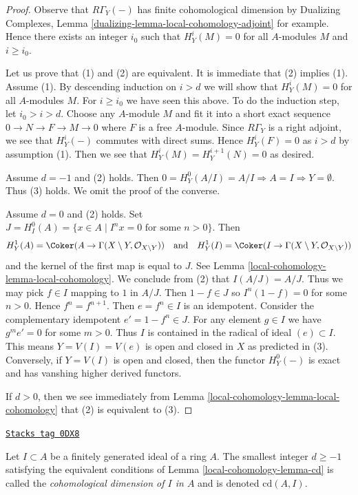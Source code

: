 \begin{proof}
Observe that $R\Gamma_Y(-)$ has finite cohomological dimension by
Dualizing Complexes, Lemma \ref{dualizing-lemma-local-cohomology-adjoint}
for example. Hence there exists an integer $i_0$ such that
$H^i_Y(M) = 0$ for all $A$-modules $M$ and $i \geq i_0$.

\medskip\noindent
Let us prove that (1) and (2) are equivalent. It is immediate that
(2) implies (1). Assume (1). By descending induction on $i > d$
we will show that $H^i_Y(M) = 0$ for all $A$-modules $M$.
For $i \geq i_0$ we have seen this above. To do the induction step,
let $i_0 > i > d$. Choose any $A$-module $M$ and fit it into
a short exact sequence $0 \to N \to F \to M \to 0$ where $F$ is a
free $A$-module. Since $R\Gamma_Y$ is a right adjoint, we see that
$H^i_Y(-)$ commutes with direct sums. Hence $H^i_Y(F) = 0$
as $i > d$ by assumption (1). Then we see that
$H^i_Y(M) = H^{i + 1}_Y(N) = 0$ as desired.

\medskip\noindent
Assume $d = -1$ and (2) holds. Then $0 = H^0_Y(A/I) = A/I \Rightarrow A = I
\Rightarrow Y = \emptyset$. Thus (3) holds. We omit the proof of the converse.

\medskip\noindent
Assume $d = 0$ and (2) holds. Set
$J = H^0_I(A) = \{x \in A \mid I^nx = 0 \text{ for some }n > 0\}$.
Then
$$
H^1_Y(A) = \Coker(A \to \Gamma(X \setminus Y, \mathcal{O}_{X \setminus Y}))
\quad\text{and}\quad
H^1_Y(I) = \Coker(I \to \Gamma(X \setminus Y, \mathcal{O}_{X \setminus Y}))
$$
and the kernel of the first map is equal to $J$. See
Lemma \ref{local-cohomology-lemma-local-cohomology}.
We conclude from (2) that $I(A/J) = A/J$.
Thus we may pick $f \in I$
mapping to $1$ in $A/J$. Then $1 - f \in J$ so $I^n(1 - f) = 0$ for some
$n > 0$. Hence $f^n = f^{n + 1}$. Then $e = f^n \in I$ is an idempotent.
Consider the complementary idempotent $e' = 1 - f^n \in J$.
For any element $g \in I$ we have $g^m e' = 0$ for some $m > 0$.
Thus $I$ is contained in the radical of ideal $(e) \subset I$.
This means $Y = V(I) = V(e)$ is open and closed in $X$ as predicted in (3).
Conversely, if $Y = V(I)$ is open and closed, then the functor
$H^0_Y(-)$ is exact and has vanshing higher derived functors.

\medskip\noindent
If $d > 0$, then we see immediately from
Lemma \ref{local-cohomology-lemma-local-cohomology} that (2) is equivalent to (3).
\end{proof}

\begin{definition}[Cd]
\label{local-cohomology-definition-cd}
\href{https://stacks.math.columbia.edu/tag/0DX8}{\texttt{Stacks tag 0DX8}}

Let $I \subset A$ be a finitely generated ideal of a ring $A$.
The smallest integer $d \geq -1$ satisfying the equivalent conditions
of Lemma \ref{local-cohomology-lemma-cd} is called the
{\it cohomological dimension of $I$ in $A$} and is
denoted $\text{cd}(A, I)$.
\end{definition}

